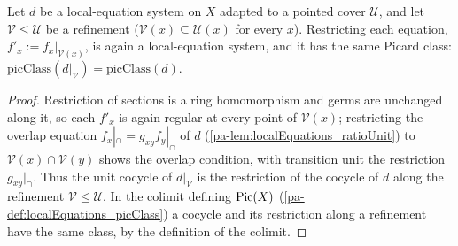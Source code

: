 \begin{lemma}
  \label{pa-lem:localEquations_restrict}
  \leanok

  Let \(d\) be a local-equation system on \(X\) adapted to a pointed cover \(\mathcal U\),
  and let \(\mathcal V \le \mathcal U\) be a refinement (\(\mathcal V(x) \subseteq
  \mathcal U(x)\) for every \(x\)). Restricting each equation, \(f'_x := f_x|_{\mathcal
  V(x)}\), is again a local-equation system, and it has the same Picard class:
  \(\mathrm{picClass}(d|_{\mathcal V}) = \mathrm{picClass}(d)\).
\end{lemma}
\begin{proof}
  \leanok
  Restriction of sections is a ring homomorphism and germs are unchanged along it, so each
  \(f'_x\) is again regular at every point of \(\mathcal V(x)\); restricting the overlap
  equation \(f_x|_\cap = g_{xy} f_y|_\cap\) of \(d\) (\ref{pa-lem:localEquations_ratioUnit})
  to \(\mathcal V(x) \cap \mathcal V(y)\) shows the overlap condition, with transition unit
  the restriction \(g_{xy}|_\cap\). Thus the unit cocycle of \(d|_{\mathcal V}\) is the
  restriction of the cocycle of \(d\) along the refinement \(\mathcal V \le \mathcal U\).
  In the colimit defining \(\operatorname{Pic}(X)\) (\ref{pa-def:localEquations_picClass}) a cocycle and its
  restriction along a refinement have the same class, by the definition of the colimit.
\end{proof}

